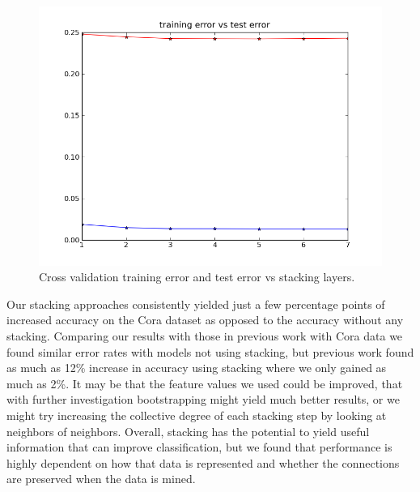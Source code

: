 \documentclass[a4paper,11pt]{article}
\begin{document}
\begin{figure}[!ht]
  \centering
  \includegraphics[width=4.5in]{WU5/CrossValidation.png}
  \caption{Cross validation training error and test error vs stacking layers.}
  \label{figures:f3}
\end{figure}

\newpage

Our stacking approaches consistently yielded just a few percentage points of
increased accuracy on the Cora dataset as opposed to the accuracy without any stacking. 
Comparing our results with those in previous work with Cora data \footnotemark[\value{footnote}]
we found similar error rates with models not using stacking, but previous work found as much as
12\% increase in accuracy using stacking where we only gained as much as 2\%. It may be that the
feature values we used could be improved, that with further investigation bootstrapping might yield
much better results, or we might try increasing the collective degree of each stacking step by 
looking at neighbors of neighbors. Overall, stacking has the potential to yield useful information
that can improve classification, but we found that performance is highly dependent on how that data is represented and whether
the connections are preserved when the data is mined.
\end{document}

